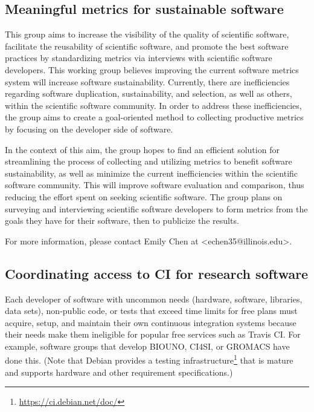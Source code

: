 \documentclass[11pt, oneside]{amsart}
\newcommand{\note}[1]{ {\textcolor{blueish}    { ***Note:      #1 }}}
\begin{document}
\subsection{Meaningful metrics for sustainable software}
\label{sec:metrics}


This group aims to increase the visibility of the quality of scientific software, facilitate the reusability of scientific software, and promote the best software practices by standardizing metrics via interviews with scientific software developers. This working group believes improving the current software metrics system will increase software sustainability. Currently, there are inefficiencies regarding software duplication, sustainability, and selection, as well as others, within the scientific software community. In order to address these inefficiencies, the group aims to create a goal-oriented method to collecting productive metrics by focusing on the developer side of software.

In the context of this aim, the group hopes to find an efficient solution for streamlining the process of collecting and utilizing metrics to benefit software sustainability, as well as minimize the current inefficiencies within the scientific software community. This will improve software evaluation and comparison, thus reducing the effort spent on seeking scientific software.
%
The group plans on surveying and interviewing scientific software developers to form metrics from the goals they have for their software, then to publicize the results.

For more information, please contact Emily Chen at <echen35@illinois.edu>.



\subsection{Coordinating access to CI for research software}
\label{sec:access}


Each developer of software with uncommon needs (hardware, software, libraries, data sets), non-public code, or tests that exceed time limits for free plans must acquire, setup, and maintain their own continuous integration systems because their needs make them ineligible for popular free services such as Travis CI.  For example, software groups that develop BIOUNO, CI4SI, or GROMACS have done this.
(Note that Debian provides a testing infrastructure\footnote{\url{https://ci.debian.net/doc/}} that is mature and supports hardware and other requirement specifications.)
\end{document}
